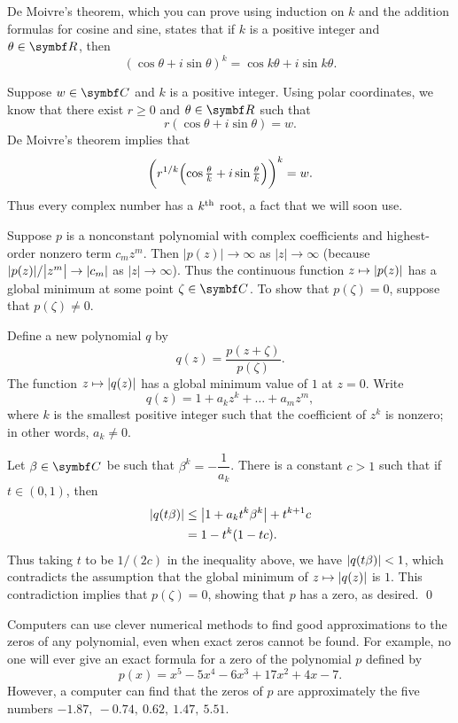
\proof
De Moivre's theorem, which you can prove using induction on $k$ and the addition formulas for cosine and sine, states that if $k$ is a positive integer and $\theta \in \R{}$, then
\[
(\cos \theta + i \sin \theta)^k = \cos k\theta + i \sin k\theta.
\]

Suppose $w \in \C{}$ and $k$ is a positive integer. Using polar coordinates, we know that there exist $r \ge 0$ and $\theta \in \R{}$ such that
\[
r(\cos \theta + i \sin \theta) = w.
\]
De Moivre's theorem implies that
\[
\paren[\bigg]{ r^{1/k} \paren[\Big]{\cos \tfrac{\theta}{k} + i \sin \tfrac{\theta}{k} } }^k = w.
\]
Thus every complex number has a $k^\nth$ root, a fact that we will soon use.

Suppose $p$ is a nonconstant polynomial with complex coefficients and highest-order nonzero term $c_m z^m\!$. Then
$|p(z)| \rightarrow \infty$ as $|z| \rightarrow \infty$
(because $\abs{p(z)}/\abs[\big]{z^m} \to \abs{c_m}$ as $|z| \rightarrow \infty$).
Thus the continuous function $z \mapsto \abs{p(z)}$ has a global minimum at some point $\zeta \in \C{}$. To show that $p(\zeta) = 0$, suppose that $p(\zeta) \ne 0$.

Define a new polynomial $q$ by
\[
q(z) = \frac{p(z + \zeta)}{p(\zeta)}.
\]
The function $z \mapsto \abs{q(z)}$ has a global minimum value of $1$ at $z = 0$.
Write
\[
 q(z) = 1 + a_k z^k + \dots + a_m z^m\!,
 \]
 where $k$ is the smallest positive integer such that the coefficient of $z^k$ is nonzero; in other words, $a_k \ne 0$.

 Let $\beta \in \C{}$ be such that
$
 \beta^k = -\dfrac{1}{a_k}$.
 There is a constant $c > 1$ such that if $t \in (0, 1)$, then
 \begin{align*}
 \abs{q(t\beta)} &\le \abs[\big]{ 1 + a_k t^k \beta^k } + t^{k+1}c \\
 &= 1 - t^k(1 - tc).
 \end{align*}
 Thus taking $t$ to be $1/(2c)$ in the inequality above, we have $\abs{q(t \beta)} < 1$, which contradicts the assumption that the global minimum of $z \mapsto \abs{q(z)}$ is $1$. This contradiction implies that $p(\zeta) = 0$, showing that $p$ has a zero, as desired.
 \qed

Computers can use clever numerical methods to find good approximations to the zeros of any polynomial, even when exact zeros cannot be found. For example, no one will ever give an exact formula for a zero of the polynomial $p$ defined by
\[
p(x) = x^5 - 5 x^4 - 6 x^3 + 17 x^2 + 4 x -7.
\]
However, a computer can find that the zeros of $p$ are approximately the five numbers
$
-1.87,\ -0.74,\ 0.62,\ 1.47,\ 5.51$.

